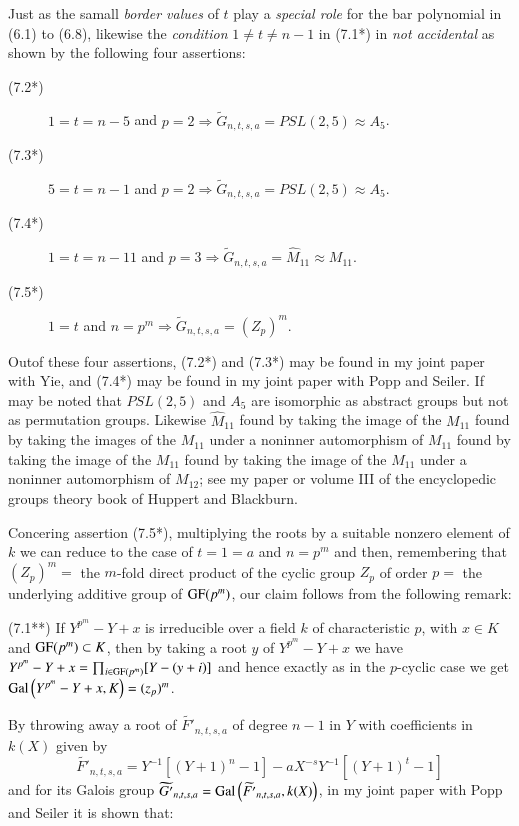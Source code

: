 Just as the samall \textit{border values} of $t$ play a \textit{special role} for the bar polynomial in (6.1) to (6.8), likewise the \textit{condition} $1\neq t \neq n-1$ in (7.1*) in \textit{not accidental} as shown by the following four assertions:
\begin{description}
\item[{\rm (7.2*)}] $1 =t =n-5$ and $ p=2\Rightarrow \widetilde{G}_{n,t,s,a} =PSL(2,5) \approx A_{5}$.
\item[{\rm (7.3*)}] $5=t=n-1$ and $ p=2\Rightarrow \widetilde{G}_{n,t,s,a} =PSL(2,5) \approx A_{5}$.
\item[{\rm (7.4*)}] $1=t=n-11$ and $p=3 \Rightarrow \widetilde{G}_{n,t,s,a} = \widehat{M}_{11}\approx M_{11}$.
\item[{\rm (7.5*)}] $1=t$ and $n=p^{m} \Rightarrow \widetilde{G}_{n,t,s,a} =(Z_{p})^m$. 
\end{description}

Out\pageoriginale of these four assertions, (7.2*) and (7.3*) may be found in my joint paper \cite{chap1-key17} with Yie, and (7.4*) may be found in my joint paper \cite{chap1-key15} with Popp and Seiler. If may be noted that $PSL(2,5)$ and $A_{5}$ are isomorphic as abstract groups but not as permutation groups. Likewise $\widehat{M}_{11}$ found by taking the image of the $M_{11}$ found by taking the images of the $M_{11}$ under a noninner automorphism of $M_{11}$ found by taking the image of the $M_{11}$ found by taking the image of the $M_{11}$ under a noninner automorphism of $M_{12}$; see my paper \cite{chap1-key8} or volume III of the encyclopedic groups theory book \cite{chap1-key36} of Huppert and Blackburn. 

Concering assertion (7.5*), multiplying the roots by a suitable nonzero element of $k$ we can reduce to the case of $t=1=a$ and $n=p^{m}$ and then, remembering that $(Z_{p})^m =$ the $m$-fold direct product of the cyclic group $Z_{p}$ of order $p=$ the underlying additive group of $\operatorname{GF}(p^m)$, our claim follows from the following remark: 

(7.1**) If $Y^{p^{m}}-Y+x$ is irreducible over a field $k$ of characteristic $p$, with $x\in K$ and $\operatorname{GF}(p^m) \subset K$, then by taking a root $y$ of $Y^{p^{m}}-Y+x$ we have $Y^{p^{m}}-Y+x = \prod_{i\in \operatorname{GF}(p^m)}[Y-(y+i)]$ and hence exactly as in the $p$-cyclic case we get $\operatorname{Gal}\left(Y^{p^{m}}-Y +x, K\right) = (z_{p})^m$. 

By throwing away a root of $\widetilde{F'}_{n,t,s,a}$ of degree $n-1$ in $Y$ with coefficients in $k(X)$ given by
$$
\widetilde{F'}_{n,t,s,a} = Y^{-1}\left[(Y+1)^{n} -1\right]- aX^{-s}Y^{-1}\left[(Y+1)^{t}-1\right]
$$
and for its Galois group $\widetilde{G'}_{n,t,s,a} = \operatorname{Gal}\left(\widetilde{F'}_{n,t,s,a}, k(X)\right)$, in my joint paper \cite{chap1-key15} with Popp and Seiler it is shown that:

